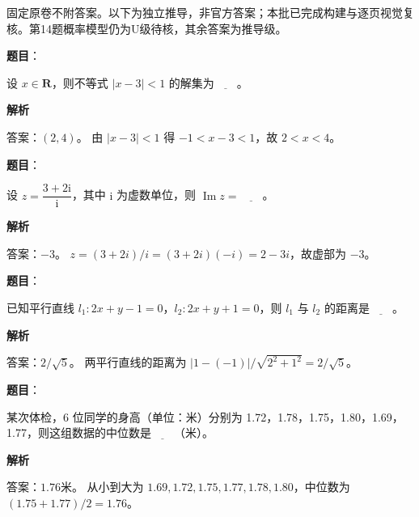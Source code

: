 

\begin{gktip}
固定原卷不附答案。以下为独立推导，非官方答案；本批已完成构建与逐页视觉复核。第14题概率模型仍为U级待核，其余答案为推导级。
\end{gktip}

\begin{answer}

\textbf{题目}：

设 \(x\in\mathbf{R}\)，则不等式 \(|x-3|<1\) 的解集为\(\underline{\qquad}\)。

\textbf{解析}

答案：\((2,4)\)。
由 \(|x-3|<1\) 得 \(-1<x-3<1\)，故 \(2<x<4\)。


\end{answer}
\begin{answer}

\textbf{题目}：

设 \(z=\dfrac{3+2\mathrm{i}}{\mathrm{i}}\)，其中 \(\mathrm{i}\) 为虚数单位，则 \(\operatorname{Im}z=\)\(\underline{\qquad}\)。

\textbf{解析}

答案：\(-3\)。
\(z=(3+2i)/i=(3+2i)(-i)=2-3i\)，故虚部为 \(-3\)。


\end{answer}
\begin{answer}

\textbf{题目}：

已知平行直线 \(l_1:2x+y-1=0\)，\(l_2:2x+y+1=0\)，则 \(l_1\) 与 \(l_2\) 的距离是\(\underline{\qquad}\)。

\textbf{解析}

答案：\(2/\sqrt5\)。
两平行直线的距离为 \(|1-(-1)|/\sqrt{2^2+1^2}=2/\sqrt5\)。


\end{answer}
\begin{answer}

\textbf{题目}：

某次体检，6 位同学的身高（单位：米）分别为 1.72，1.78，1.75，1.80，1.69，1.77，则这组数据的中位数是\(\underline{\qquad}\)（米）。

\textbf{解析}

答案：\(1.76\)米。
从小到大为 \(1.69,1.72,1.75,1.77,1.78,1.80\)，中位数为 \((1.75+1.77)/2=1.76\)。


\end{answer}
